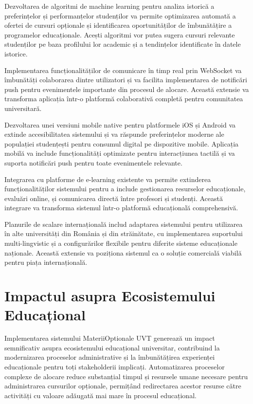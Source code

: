 \documentclass[12pt,a4paper]{report}
\begin{document}
Dezvoltarea de algoritmi de machine learning pentru analiza istorică a preferințelor și performanțelor studenților va permite optimizarea automată a ofertei de cursuri opționale și identificarea oportunităților de îmbunătățire a programelor educaționale. Acești algoritmi vor putea sugera cursuri relevante studenților pe baza profilului lor academic și a tendințelor identificate în datele istorice.

Implementarea funcționalităților de comunicare în timp real prin WebSocket va îmbunătăți colaborarea dintre utilizatori și va facilita implementarea de notificări push pentru evenimentele importante din procesul de alocare. Această extensie va transforma aplicația într-o platformă colaborativă completă pentru comunitatea universitară.

Dezvoltarea unei versiuni mobile native pentru platformele iOS și Android va extinde accesibilitatea sistemului și va răspunde preferințelor moderne ale populației studențești pentru consumul digital pe dispozitive mobile. Aplicația mobilă va include funcționalități optimizate pentru interacțiunea tactilă și va suporta notificări push pentru toate evenimentele relevante.

Integrarea cu platforme de e-learning existente va permite extinderea funcționalităților sistemului pentru a include gestionarea resurselor educaționale, evaluări online, și comunicarea directă între profesori și studenți. Această integrare va transforma sistemul într-o platformă educațională comprehensivă.

Planurile de scalare internațională includ adaptarea sistemului pentru utilizarea în alte universități din România și din străinătate, cu implementarea suportului multi-lingvistic și a configurărilor flexibile pentru diferite sisteme educaționale naționale. Această extensie va poziționa sistemul ca o soluție comercială viabilă pentru piața internațională.
 
\section{Impactul asupra Ecosistemului Educațional}

Implementarea sistemului MateriiOptionale UVT generează un impact semnificativ asupra ecosistemului educațional universitar, contribuind la modernizarea proceselor administrative și la îmbunătățirea experienței educaționale pentru toți stakeholderii implicați. Automatizarea proceselor complexe de alocare reduce substanțial timpul și resursele umane necesare pentru administrarea cursurilor opționale, permițând redirectarea acestor resurse către activități cu valoare adăugată mai mare în procesul educațional.
\end{document}
